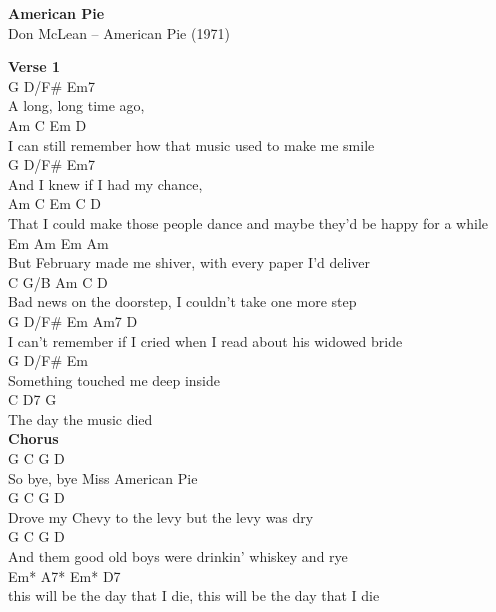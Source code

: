 \documentclass[a4paper]{article}
\begin{document}
    \begin{center}
        \textbf{American Pie}
        ~\\
        Don McLean -- American Pie (1971)
    \end{center}
    {
        \scriptsize
        \textbf{Verse 1}
        ~\\
        {
            \cutive
            \obeyspaces
  G     D/F\#    Em7
\\
A long, long time ago,
\\
Am            C                  Em                  D
\\
I can still remember how that music used to make me smile
\\
    G      D/F\#   Em7
\\
And I knew if I had my chance,
\\
     Am                 C                Em              C            D
\\
That I could make those people dance and maybe they'd be happy for a while
\\
    Em       Am              Em                 Am
\\
But February made me shiver, with every paper I'd deliver
\\
C        G/B    Am             C                     D
\\
Bad news on the doorstep, I couldn't take one more step
\\
  G          D/F\#     Em           Am7            D
\\
I can't remember if I cried when I read about his widowed bride
\\
G         D/F\#       Em
\\
Something touched me deep inside
\\
    C      D7      G
\\
The day the music died
\\

        }
        \textbf{Chorus}
        ~\\
        {
            \cutive
            \obeyspaces
   G    C        G        D
\\
So bye, bye Miss American Pie
\\
         G            C            G        D
\\
Drove my Chevy to the levy but the levy was dry
\\
         G        C                  G           D
\\
And them good old boys were drinkin' whiskey and rye
\\
Em*                         A7*   Em*                         D7
\\
this will be the day that I die, this will be the day that I die
\\

}}
\end{document}
